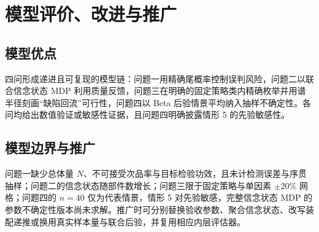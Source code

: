 \section{模型评价、改进与推广}

\subsection{模型优点}

四问形成递进且可复现的模型链：问题一用精确尾概率控制误判风险，问题二以联合信念状态 MDP 利用质量反馈，问题三在明确的固定策略类内精确枚举并用谱半径刻画“缺陷回流”可行性，问题四以 Beta 后验情景平均纳入抽样不确定性。各问均给出数值验证或敏感性证据，且问题四明确披露情形 5 的先验敏感性。

\subsection{模型边界与推广}

问题一缺少总体量 $N$、不可接受次品率与目标检验功效，且未计检测误差与序贯抽样；问题二的信念状态随部件数增长；问题三限于固定策略与单因素 $\pm20\%$ 网格；问题四的 $n=40$ 仅为代表情景，情形 5 对先验敏感，完整信念状态 MDP 的参数不确定性版本尚未求解。推广时可分别替换验收参数、聚合信念状态、改写装配递推或换用真实样本量与联合后验，并复用相应内层评估器。
